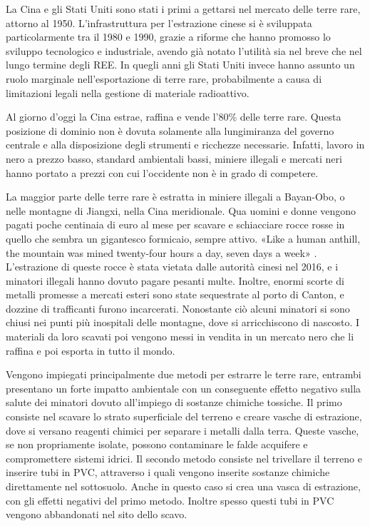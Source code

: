 \documentclass[12pt,a4paper,oneside]{book}
\begin{document}
La Cina e gli Stati Uniti sono stati i primi a gettarsi nel mercato delle terre rare, attorno al 1950. L'infrastruttura per l'estrazione cinese si è sviluppata particolarmente tra il 1980 e 1990, grazie a riforme che hanno promosso lo sviluppo tecnologico e industriale, avendo già notato l'utilità sia nel breve che nel lungo termine degli REE. In quegli anni gli Stati Uniti invece hanno assunto un ruolo marginale nell'esportazione di terre rare, probabilmente a causa di limitazioni legali nella gestione di materiale radioattivo.

Al giorno d'oggi la Cina estrae, raffina e vende l'80\% delle terre rare. Questa posizione di dominio non è dovuta solamente alla lungimiranza del governo centrale e alla disposizione degli strumenti e ricchezze necessarie. Infatti, lavoro in nero a prezzo basso, standard ambientali bassi, miniere illegali e mercati neri hanno portato a prezzi con cui l'occidente non è in grado di competere. 

La maggior parte delle terre rare è estratta in miniere illegali a Bayan-Obo, o nelle montagne di Jiangxi, nella Cina meridionale. Qua uomini e donne vengono pagati poche centinaia di euro al mese per scavare e schiacciare rocce rosse in quello che sembra un gigantesco formicaio, sempre attivo.
«Like a human anthill, the mountain was mined twenty-four hours a day, seven days a week» \citep[p. 24]{pitron2020rare}.
L'estrazione di queste rocce è stata vietata dalle autorità cinesi nel 2016, e i minatori illegali hanno dovuto pagare pesanti multe. Inoltre, enormi scorte di metalli promesse a mercati esteri sono state sequestrate al porto di Canton, e dozzine di trafficanti furono incarcerati.
Nonostante ciò alcuni minatori si sono chiusi nei punti più inospitali delle montagne, dove si arricchiscono di nascosto. I materiali da loro scavati poi vengono messi in vendita in un mercato nero che li raffina e poi esporta in tutto il mondo.

Vengono impiegati principalmente due metodi per estrarre le terre rare, entrambi presentano un forte impatto ambientale con un conseguente effetto negativo sulla salute dei minatori dovuto all'impiego di sostanze chimiche tossiche. Il primo consiste nel scavare lo strato superficiale del terreno e creare vasche di estrazione, dove si versano reagenti chimici per separare i metalli dalla terra. Queste vasche, se non propriamente isolate, possono contaminare le falde acquifere e compromettere sistemi idrici.
Il secondo metodo consiste nel trivellare il terreno e inserire tubi in PVC, attraverso i quali vengono inserite sostanze chimiche direttamente nel sottosuolo. Anche in questo caso si crea una vasca di estrazione, con gli effetti negativi del primo metodo. Inoltre spesso questi tubi in PVC vengono abbandonati nel sito dello scavo.
\end{document}
